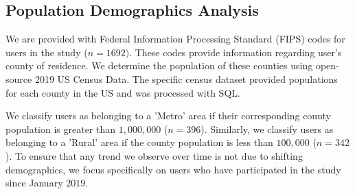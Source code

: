 \subsection{Population Demographics Analysis}
We are provided with Federal Information Processing Standard (FIPS) codes for users in the study ($n=1692)$. These codes provide information regarding user's county of residence. We determine the population of these counties using open-source 2019 US Census Data. The specific census dataset provided populations for each county in the US and was processed with SQL. 

We classify users as belonging to a 'Metro' area if their corresponding county population is greater than $1,000,000$ ($n=396$). Similarly, we classify users as belonging to a 'Rural' area if the county population is less than $100,000$ ($n=342$). To ensure that any trend we observe over time is not due to shifting demographics, we focus specifically on users who have participated in the study since January $2019$.
